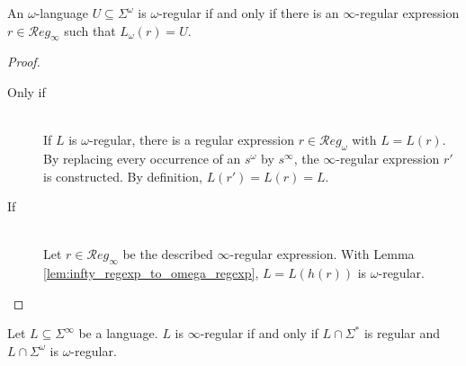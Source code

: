 \begin{prop}
	An $\omega$-language $U \subseteq \Sigma^\omega$ is $\omega$-regular if and only if there is an $\infty$-regular expression $r \in \mathcal{R}eg_\infty$ such that $L_\omega(r) = U$.
\end{prop}

\begin{proof}
	\begin{description}
	\item[Only if] \hfill \\
		If $L$ is $\omega$-regular, there is a regular expression $r \in \mathcal{R}eg_\omega$ with $L = L(r)$. By replacing every occurrence of an $s^\omega$ by $s^\infty$, the $\infty$-regular expression $r'$ is constructed. By definition, $L(r') = L(r) = L$.
		
	\item[If] \hfill \\
		Let $r \in \mathcal{R}eg_\infty$ be the described $\infty$-regular expression. With Lemma \ref{lem:infty_regexp_to_omega_regexp}, $L = L(h(r))$ is $\omega$-regular.
	\end{description}
\end{proof}


\begin{prop}
	Let $L \subseteq \Sigma^\infty$ be a language. $L$ is $\infty$-regular if and only if $L \cap \Sigma^*$ is regular and $L \cap \Sigma^\omega$ is $\omega$-regular.
	\label{prop:infty_language_split_omega_regular}
\end{prop}

